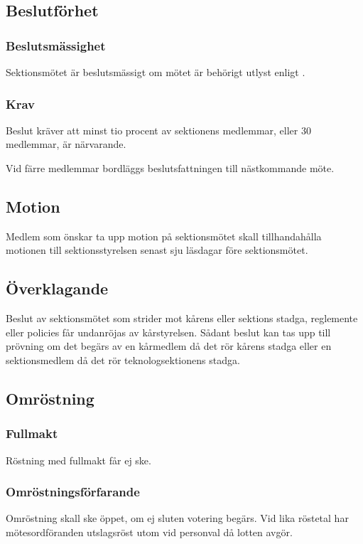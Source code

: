 \subsection{Beslutförhet}

\subsubsection{Beslutsmässighet}
Sektionsmötet är beslutsmässigt om mötet är behörigt utlyst enligt .

\subsubsection{Krav}
Beslut kräver att minst tio procent av sektionens medlemmar, eller 30 medlemmar, är närvarande.

Vid färre medlemmar bordläggs beslutsfattningen till nästkommande möte.

\subsection{Motion}
Medlem som önskar ta upp motion på sektionsmötet skall tillhandahålla motionen till sektionsstyrelsen senast sju läsdagar före sektionsmötet.

\subsection{Överklagande}
Beslut av sektionsmötet som strider mot kårens eller sektions stadga, reglemente eller policies får undanröjas av kårstyrelsen. Sådant beslut kan tas upp till prövning om det begärs av en kårmedlem då det rör kårens stadga eller en sektionsmedlem då det rör teknologsektionens stadga.

\subsection{Omröstning}

\subsubsection{Fullmakt}
Röstning med fullmakt får ej ske.

\subsubsection{Omröstningsförfarande}
Omröstning skall ske öppet, om ej sluten votering begärs. Vid lika röstetal har mötesordföranden utslagsröst utom vid personval då lotten avgör.

